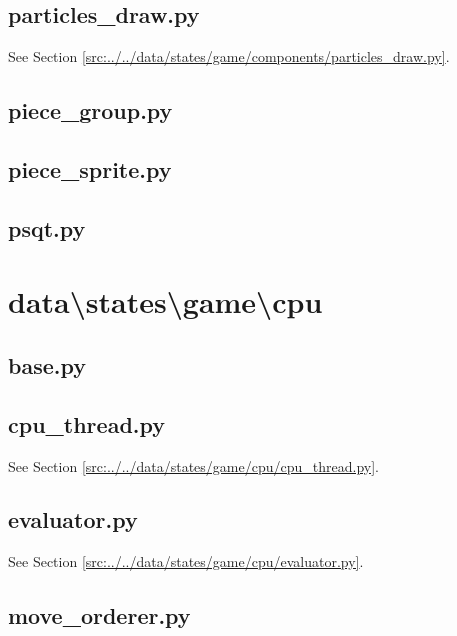 \documentclass[../main/main.tex]{subfiles}
\begin{document}
\subsection{particles\_draw.py}
See Section \ref{src:../../data/states/game/components/particles_draw.py}.

\subsection{piece\_group.py}

\label{src:data/states/game/components/piece_group.py}

\subsection{piece\_sprite.py}

\label{src:data/states/game/components/piece_sprite.py}

\subsection{psqt.py}

\label{src:data/states/game/components/psqt.py}

\section{data\textbackslash states\textbackslash game\textbackslash cpu}
\subsection{base.py}

\label{src:data/states/game/cpu/base.py}

\subsection{cpu\_thread.py}
See Section \ref{src:../../data/states/game/cpu/cpu_thread.py}.

\subsection{evaluator.py}
See Section \ref{src:../../data/states/game/cpu/evaluator.py}.

\subsection{move\_orderer.py}

\label{src:data/states/game/cpu/move_orderer.py}
\end{document}
